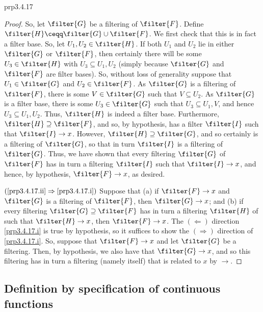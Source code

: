 \begin{prp}{}{prp3.4.17}
\begin{proof}
So, let $\filter{G}$ be a filtering of $\filter{F}$.  Define $\filter{H}\ceqq \filter{G}\cup \filter{F}$.  We first check that this is in fact a filter base.  So, let $U_1,U_2\in \filter{H}$.  If both $U_1$ and $U_2$ lie in either $\filter{G}$ or $\filter{F}$, then certainly there will be some $U_3\in \filter{H}$ with $U_3\subseteq U_1,U_2$ (simply because $\filter{G}$ and $\filter{F}$ are filter bases).  So, without loss of generality suppose that $U_1\in \filter{G}$ and $U_2\in \filter{F}$.  As $\filter{G}$ is a filtering of $\filter{F}$, there is some $V\in \filter{G}$ such that $V\subseteq U_2$.  As $\filter{G}$ is a filter base, there is some $U_3\in \filter{G}$ such that $U_3\subseteq U_1,V$, and hence $U_3\subseteq U_1,U_2$.  Thus, $\filter{H}$ is indeed a filter base.  Furthermore, $\filter{H}\supseteq \filter{F}$, and so, by hypothesis, has a filter $\filter{I}$ such that $\filter{I}\to x$.  However, $\filter{H}\supseteq \filter{G}$, and so certainly is a filtering of $\filter{G}$, so that in turn $\filter{I}$ is a filtering of $\filter{G}$.  Thus, we have shown that every filtering $\filter{G}$ of $\filter{F}$ has in turn a filtering $\filter{I}$ such that $\filter{I}\to x$, and hence, by hypothesis, $\filter{F}\to x$, as desired.

\blankline
\noindent
$(\cref{prp3.4.17.ii}\Rightarrow \cref{prp3.4.17.i})$ Suppose that (a) if $\filter{F}\to x$ and $\filter{G}$ is a filtering of $\filter{F}$, then $\filter{G}\to x$; and (b) if every filtering $\filter{G}\supseteq \filter{F}$ has in turn a filtering $\filter{H}$ of such that $\filter{H}\to x$, then $\filter{F}\to x$.  The $(\Leftarrow )$ direction \cref{prp3.4.17.i} is true by hypothesis, so it suffices to show the $(\Rightarrow )$ direction of \cref{prp3.4.17.i}.  So, suppose that $\filter{F}\to x$ and let $\filter{G}$ be a filtering.  Then, by hypothesis, we also have that $\filter{G}\to x$, and so this filtering has in turn a filtering (namely itself) that is related to $x$ by $\to$.
\end{proof}
\end{prp}

\subsection{Definition by specification of continuous functions}

